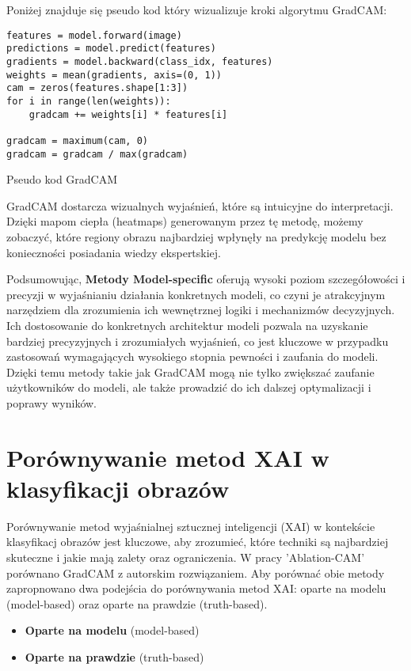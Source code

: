 Poniżej znajduje się pseudo kod który wizualizuje kroki algorytmu GradCAM:

\begin{listing}
	\begin{verbatim}
features = model.forward(image)
predictions = model.predict(features)
gradients = model.backward(class_idx, features)
weights = mean(gradients, axis=(0, 1))
cam = zeros(features.shape[1:3])
for i in range(len(weights)):
    gradcam += weights[i] * features[i]

gradcam = maximum(cam, 0)
gradcam = gradcam / max(gradcam)
    \end{verbatim}
	\caption{Pseudo kod GradCAM} \label{listing:gradcam}
\end{listing}

GradCAM dostarcza  wizualnych wyjaśnień, które są intuicyjne do interpretacji.
Dzięki mapom ciepła (heatmaps) generowanym przez tę metodę, możemy zobaczyć, które regiony obrazu najbardziej wpłynęły na predykcję modelu bez konieczności posiadania wiedzy ekspertskiej.

\vspace{1cm}

Podsumowując, \textbf{Metody Model-specific} oferują wysoki poziom szczegółowości i precyzji w wyjaśnianiu działania konkretnych modeli, co czyni je atrakcyjnym narzędziem dla zrozumienia ich wewnętrznej logiki i mechanizmów decyzyjnych.
Ich dostosowanie do konkretnych architektur modeli pozwala na uzyskanie bardziej precyzyjnych i zrozumiałych wyjaśnień, co jest kluczowe w przypadku zastosowań wymagających wysokiego stopnia pewności i zaufania do modeli.
Dzięki temu metody takie jak GradCAM mogą nie tylko zwiększać zaufanie użytkowników do modeli, ale także prowadzić do ich dalszej optymalizacji i poprawy wyników.

\section*{Porównywanie metod XAI w klasyfikacji obrazów}
Porównywanie metod wyjaśnialnej sztucznej inteligencji (XAI) w kontekście klasyfikacj obrazów jest kluczowe, aby zrozumieć, które techniki są najbardziej skuteczne i jakie mają zalety oraz ograniczenia.
W pracy 'Ablation-CAM'\cite{9093360} porównano GradCAM z autorskim rozwiązaniem.
Aby porównać obie metody zapropnowano dwa podejścia do porównywania metod XAI: oparte na modelu (model-based) oraz oparte na prawdzie (truth-based).
\begin{itemize}
	\item \textbf{Oparte na modelu} (model-based)
	\item \textbf{Oparte na prawdzie} (truth-based)
\end{itemize}

